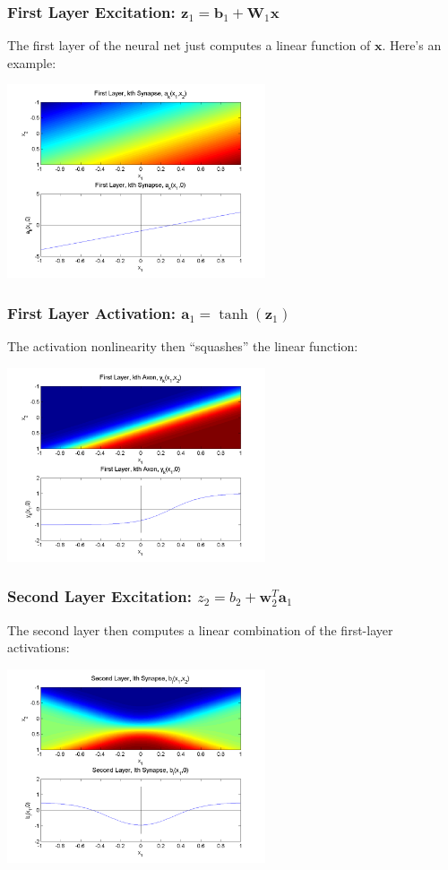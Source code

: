 \documentclass{beamer}
\begin{document}
\begin{frame}
  \frametitle{First Layer Excitation:
    $\mathbf{z}_{1}=\mathbf{b}_{1}+\mathbf{W}_1\mathbf{x}$} The first
  layer of the neural net just computes a linear function of
  $\mathbf{x}$. Here's an example:
  \centerline{\includegraphics[width=3in]{figs/nn_synapse1.png}}
\end{frame}

\begin{frame}
  \frametitle{First Layer Activation: $\mathbf{a}_{1}=\tanh(\mathbf{z}_{1})$}

  The activation nonlinearity then ``squashes'' the linear function:
  \centerline{\includegraphics[width=3in]{figs/nn_axon1.png}}
\end{frame}

\begin{frame}
  \frametitle{Second Layer Excitation:
    $z_{2}=b_{2}+\mathbf{w}_2^T\mathbf{a}_{1}$}

  The second layer then computes a linear combination of the
  first-layer activations:
  \centerline{\includegraphics[width=3in]{figs/nn_synapse2.png}}
\end{frame}
\end{document}

